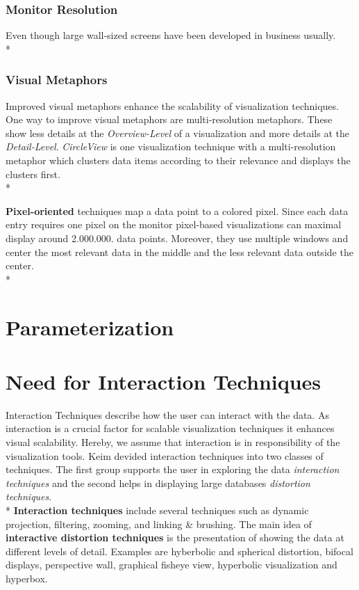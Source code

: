 \subsubsection*{Monitor Resolution}
Even though large wall-sized screens have been developed in business usually. 
\\*
\subsubsection*{Visual Metaphors}
Improved visual metaphors enhance the scalability of visualization techniques\cite{Eick2002}.  One way to improve visual metaphors are multi-resolution metaphors\cite{Keim2005}. These show less details at the \textit{Overview-Level} of a visualization and more details at the \textit{Detail-Level}. \textit{CircleView} is one visualization technique with a multi-resolution metaphor which clusters data items according to their relevance and displays the clusters first.
\\*

\textbf{Pixel-oriented} techniques map a data point to a colored pixel. Since each data entry requires one pixel on the monitor pixel-based visualizations can maximal display around 2.000.000. data points. Moreover, they use multiple windows and center the most relevant data in the middle and the less relevant data outside the center\cite{Keim1996}.\\*


\section{Parameterization}

\section{Need for Interaction Techniques}
Interaction Techniques describe how the user can interact with the data. As interaction is a crucial factor for scalable visualization techniques it enhances visual scalability\cite{tegarden1999}. 
Hereby, we assume that interaction is in responsibility of the visualization tools. Keim\cite{2002} devided interaction techniques into two classes of techniques. The first group supports the user in exploring the data \textit{interaction techniques} and the second helps in displaying large databases \textit{distortion techniques}. \\*
\textbf{Interaction techniques} include several techniques such as dynamic projection, filtering, zooming, and linking \& brushing.
The main idea of \textbf{interactive distortion techniques} is the presentation of showing the data at different levels of detail. Examples are hyberbolic and spherical distortion, bifocal displays, perspective wall, graphical fisheye view, hyperbolic visualization and hyperbox\cite{Keim2002}. 

